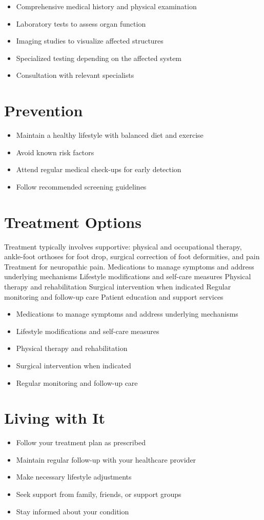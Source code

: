 \begin{itemize}[noitemsep]
  \item Comprehensive medical history and physical examination
  \item Laboratory tests to assess organ function
  \item Imaging studies to visualize affected structures
  \item Specialized testing depending on the affected system
  \item Consultation with relevant specialists
\end{itemize}
\section{Prevention}
\begin{itemize}[noitemsep]
  \item Maintain a healthy lifestyle with balanced diet and exercise
  \item Avoid known risk factors
  \item Attend regular medical check-ups for early detection
  \item Follow recommended screening guidelines
\end{itemize}
\section{Treatment Options}
Treatment typically involves supportive: physical and occupational therapy, ankle-foot orthoses for foot drop, surgical correction of foot deformities, and pain Treatment for neuropathic pain. Medications to manage symptoms and address underlying mechanisms Lifestyle modifications and self-care measures Physical therapy and rehabilitation Surgical intervention when indicated Regular monitoring and follow-up care Patient education and support services

\begin{itemize}[noitemsep]
  \item Medications to manage symptoms and address underlying mechanisms
  \item Lifestyle modifications and self-care measures
  \item Physical therapy and rehabilitation
  \item Surgical intervention when indicated
  \item Regular monitoring and follow-up care
\end{itemize}
\section{Living with It}
\begin{itemize}[noitemsep]
  \item Follow your treatment plan as prescribed
  \item Maintain regular follow-up with your healthcare provider
  \item Make necessary lifestyle adjustments
  \item Seek support from family, friends, or support groups
  \item Stay informed about your condition
\end{itemize}
